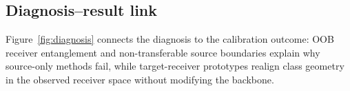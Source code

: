 


\subsection{Diagnosis--result link}
Figure~\ref{fig:diagnosis} connects the diagnosis to the calibration outcome: OOB receiver entanglement and non-transferable source boundaries explain why source-only methods fail, while target-receiver prototypes realign class geometry in the observed receiver space without modifying the backbone.
